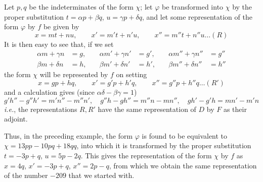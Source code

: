 Let $p,q$ be the indeterminates of the form $\chi$; let $\varphi$ be
transformed into $\chi$ by the proper substitution $t=\alpha p+\beta q$, $u=\gamma p+\delta q$,
and let some representation of the form $\varphi$ by $f$ be given by
\[
x=mt+nu,\qquad x'=m't+n'u,\qquad x''=m''t+n''u\ldots(R)
\]
It is then easy to see that, if we set
\[
\begin{aligned}
\alpha m+\gamma n&=g,&\quad \alpha m'+\gamma n'&=g',&\quad \alpha m''+\gamma n''&=g''\\
\beta m+\delta n&=h,&\quad \beta m'+\delta n'&=h',&\quad \beta m''+\delta n''&=h''
\end{aligned}
\]
the form $\chi$ will be represented by $f$ on setting
\[
x=gp+hq,\qquad x'=g'p+h'q,\qquad x''=g''p+h''q\ldots(R')
\]
and a calculation gives (since $\alpha\delta-\beta\gamma=1$)
\[
g'h''-g''h'=m'n''-m''n',\quad
g''h-gh''=m''n-mn'',\quad
gh'-g'h=mn'-m'n
\]
\textit{i.e.}, the representations $R,R'$ have the same representation
of $D$ by $F$ as their adjoint.

Thus, in the preceding example, the form $\varphi$ is found to be equivalent to
$\chi=13pp-10pq+18qq$, into which it is transformed by the proper substitution
$t=-3p+q$, $u=5p-2q$. This gives the representation of the form $\chi$ by $f$
as $x=4q$, $x'=-3p+q$, $x''=2p-q$, from which we obtain the same representation
of the number $-209$ that we started with.

